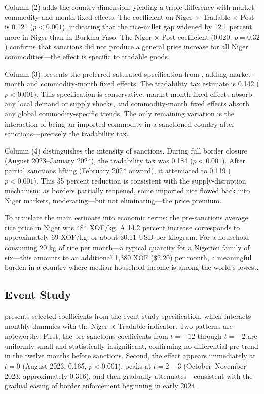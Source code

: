 \documentclass[12pt]{article}
\begin{document}
Column (2) adds the country dimension, yielding a triple-difference with market-commodity and month fixed effects. The coefficient on Niger $\times$ Tradable $\times$ Post is 0.121 ($p < 0.001$), indicating that the rice-millet gap widened by 12.1 percent more in Niger than in Burkina Faso. The Niger $\times$ Post coefficient (0.020, $p = 0.32$) confirms that sanctions did not produce a general price increase for all Niger commodities---the effect is specific to tradable goods.

Column (3) presents the preferred saturated specification from , adding market-month and commodity-month fixed effects. The tradability tax estimate is 0.142 ($p < 0.001$). This specification is conservative: market-month fixed effects absorb any local demand or supply shocks, and commodity-month fixed effects absorb any global commodity-specific trends. The only remaining variation is the interaction of being an imported commodity in a sanctioned country after sanctions---precisely the tradability tax.

Column (4) distinguishes the intensity of sanctions. During full border closure (August 2023--January 2024), the tradability tax was 0.184 ($p < 0.001$). After partial sanctions lifting (February 2024 onward), it attenuated to 0.119 ($p < 0.001$). This 35 percent reduction is consistent with the supply-disruption mechanism: as borders partially reopened, some imported rice flowed back into Niger markets, moderating---but not eliminating---the price premium.

To translate the main estimate into economic terms: the pre-sanctions average rice price in Niger was 484 XOF/kg. A 14.2 percent increase corresponds to approximately 69 XOF/kg, or about \$0.11 USD per kilogram. For a household consuming 20 kg of rice per month---a typical quantity for a Nigerien family of six---this amounts to an additional 1,380 XOF (\$2.20) per month, a meaningful burden in a country where median household income is among the world's lowest.



\subsection{Event Study}

 presents selected coefficients from the event study specification, which interacts monthly dummies with the Niger $\times$ Tradable indicator. Two patterns are noteworthy. First, the pre-sanctions coefficients from $t = -12$ through $t = -2$ are uniformly small and statistically insignificant, confirming no differential pre-trend in the twelve months before sanctions. Second, the effect appears immediately at $t = 0$ (August 2023, 0.165, $p < 0.001$), peaks at $t = 2{-}3$ (October--November 2023, approximately 0.316), and then gradually attenuates---consistent with the gradual easing of border enforcement beginning in early 2024.
\end{document}
